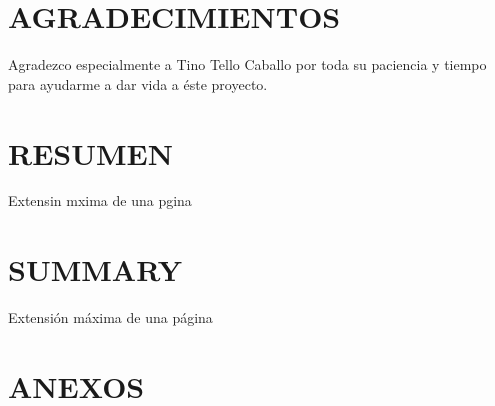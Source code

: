 \documentclass[spanish,12pt, a4paper,twoside]{paper}
\let\oldsection\section
\def\section{\cleardoublepage\oldsection}
\newcommand\blankpage{%
\null
\thispagestyle{empty}%
\addtocounter{page}{-1}%
\newpage}
\begin{document}
    \afterpage{\blankpage}


    \section*{AGRADECIMIENTOS}
    Agradezco especialmente a Tino Tello Caballo por toda su paciencia y tiempo para ayudarme
    a dar vida a éste proyecto.

    \section*{RESUMEN}
    Extensin mxima de una pgina


    \section*{SUMMARY}
    Extensión máxima de una página


    \tableofcontents %



    \listoffigures

    \listoftables

    \newpage


    
    \newpage

	
	\newpage

%	


    \section*{ANEXOS}


    \newpage

        
        

\end{document}
